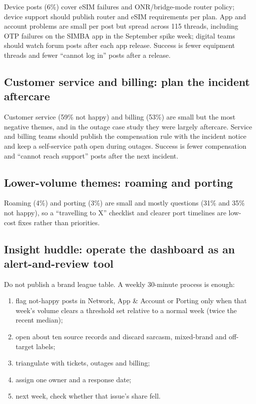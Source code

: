 \documentclass[11pt,a4paper]{article}
\begin{document}
Device posts (6\%) cover eSIM failures and ONR/bridge-mode router policy; device support should publish router and eSIM requirements per plan. App and account problems are small per post but spread across 115 threads, including OTP failures on the SIMBA app in the September spike week; digital teams should watch forum posts after each app release. Success is fewer equipment threads and fewer ``cannot log in'' posts after a release.

\subsection{Customer service and billing: plan the incident aftercare}

Customer service (59\% not happy) and billing (53\%) are small but the most negative themes, and in the outage case study they were largely aftercare. Service and billing teams should publish the compensation rule with the incident notice and keep a self-service path open during outages. Success is fewer compensation and ``cannot reach support'' posts after the next incident.

\subsection{Lower-volume themes: roaming and porting}

Roaming (4\%) and porting (3\%) are small and mostly questions (31\% and 35\% not happy), so a ``travelling to X'' checklist and clearer port timelines are low-cost fixes rather than priorities.

\subsection{Insight huddle: operate the dashboard as an alert-and-review tool}

Do not publish a brand league table. A weekly 30-minute process is enough:

\begin{enumerate}
  \item flag not-happy posts in Network, App \& Account or Porting only when that week's volume clears a threshold set relative to a normal week (twice the recent median);
  \item open about ten source records and discard sarcasm, mixed-brand and off-target labels;
  \item triangulate with tickets, outages and billing;
  \item assign one owner and a response date;
  \item next week, check whether that issue's share fell.
\end{enumerate}
\end{document}
